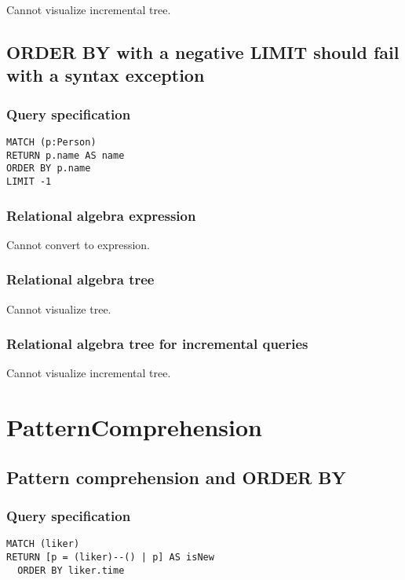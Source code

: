 Cannot visualize incremental tree.

\subsection{ORDER BY with a negative LIMIT should fail with a syntax exception}

\subsubsection*{Query specification}

\begin{lstlisting}
MATCH (p:Person)
RETURN p.name AS name
ORDER BY p.name
LIMIT -1
\end{lstlisting}

\subsubsection*{Relational algebra expression}

Cannot convert to expression.

\subsubsection*{Relational algebra tree}

Cannot visualize tree.

\subsubsection*{Relational algebra tree for incremental queries}

Cannot visualize incremental tree.

\section{PatternComprehension}

\subsection{Pattern comprehension and ORDER BY}

\subsubsection*{Query specification}

\begin{lstlisting}
MATCH (liker)
RETURN [p = (liker)--() | p] AS isNew
  ORDER BY liker.time
\end{lstlisting}

